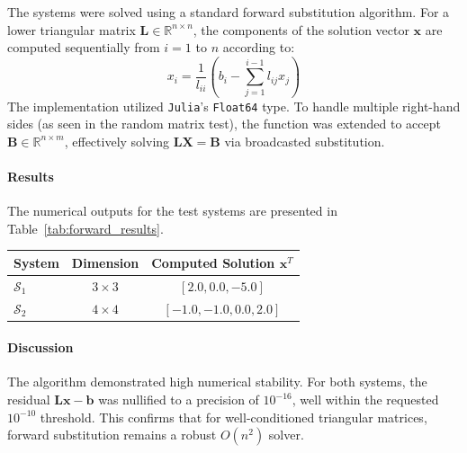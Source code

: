 \begin{solution}
    The systems were solved using a standard forward substitution algorithm. For a lower triangular matrix $\mathbf{L} \in \mathbb{R}^{n \times n}$, the components of the solution vector $\mathbf{x}$ are computed sequentially from $i = 1$ to $n$ according to:
    \[
      x_i = \frac{1}{l_{ii}} \left( b_i - \sum_{j=1}^{i-1} l_{ij} x_j \right) 
    \]
    The implementation utilized \texttt{Julia}'s \texttt{Float64} type. To handle multiple right-hand sides (as seen in the random matrix test), the function was extended to accept $\mathbf{B} \in \mathbb{R}^{n \times m}$, effectively solving $\mathbf{L}\mathbf{X} = \mathbf{B}$ via broadcasted substitution.

    \paragraph{Results}
    The numerical outputs for the test systems are presented in Table~\ref{tab:forward_results}.
    \begin{center}
        \centering
        \label{tab:forward_results}
        \begin{tabular}{lcc}
            \hline
            System & Dimension & Computed Solution $\mathbf{x}^T$ \\
            \hline
            $\mathcal{S}_1$ & $3 \times 3$ & $[2.0, 0.0, -5.0]$ \\
            $\mathcal{S}_2$ & $4 \times 4$ & $[-1.0, -1.0, 0.0, 2.0]$ \\
            \hline
        \end{tabular}
    \end{center}

    \paragraph{Discussion}
    The algorithm demonstrated high numerical stability. For both systems, the residual $\mathbf{L}\mathbf{x} - \mathbf{b}$ was nullified to a precision of $10^{-16}$, well within the requested $10^{-10}$ threshold. This confirms that for well-conditioned triangular matrices, forward substitution remains a robust $O(n^2)$ solver.

\end{solution}

